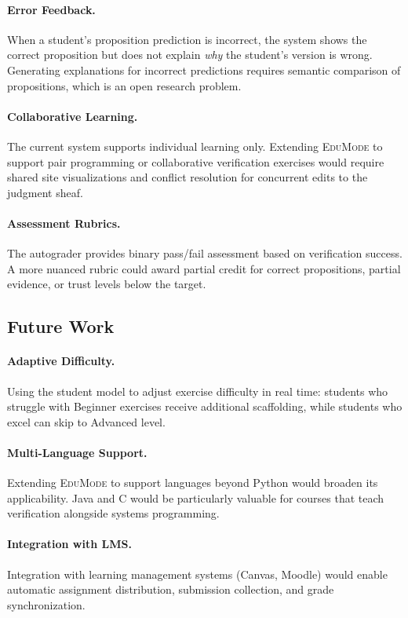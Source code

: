 \documentclass[11pt]{article}
\newcommand{\EduMode}{\textsc{EduMode}}
\begin{document}
\paragraph{Error Feedback.}
When a student's proposition prediction is incorrect, the system shows the
correct proposition but does not explain \emph{why} the student's version
is wrong. Generating explanations for incorrect predictions requires
semantic comparison of propositions, which is an open research problem.

\paragraph{Collaborative Learning.}
The current system supports individual learning only. Extending \EduMode{}
to support pair programming or collaborative verification exercises would
require shared site visualizations and conflict resolution for concurrent
edits to the judgment sheaf.

\paragraph{Assessment Rubrics.}
The autograder provides binary pass/fail assessment based on verification
success. A more nuanced rubric could award partial credit for correct
propositions, partial evidence, or trust levels below the target.

\subsection{Future Work}

\paragraph{Adaptive Difficulty.}
Using the student model to adjust exercise difficulty in real time:
students who struggle with Beginner exercises receive additional
scaffolding, while students who excel can skip to Advanced level.

\paragraph{Multi-Language Support.}
Extending \EduMode{} to support languages beyond Python would broaden its
applicability. Java and C would be particularly valuable for courses that
teach verification alongside systems programming.

\paragraph{Integration with LMS.}
Integration with learning management systems (Canvas, Moodle) would enable
automatic assignment distribution, submission collection, and grade
synchronization.
\end{document}
